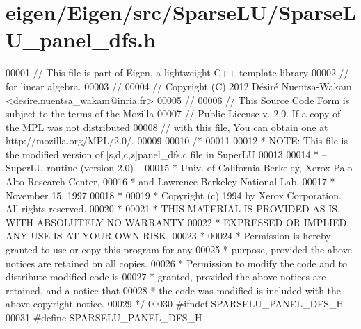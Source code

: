 \hypertarget{eigen_2_eigen_2src_2_sparse_l_u_2_sparse_l_u__panel__dfs_8h_source}{}\section{eigen/\+Eigen/src/\+Sparse\+L\+U/\+Sparse\+L\+U\+\_\+panel\+\_\+dfs.h}
\label{eigen_2_eigen_2src_2_sparse_l_u_2_sparse_l_u__panel__dfs_8h_source}

\begin{DoxyCode}
00001 \textcolor{comment}{// This file is part of Eigen, a lightweight C++ template library}
00002 \textcolor{comment}{// for linear algebra.}
00003 \textcolor{comment}{//}
00004 \textcolor{comment}{// Copyright (C) 2012 Désiré Nuentsa-Wakam <desire.nuentsa\_wakam@inria.fr>}
00005 \textcolor{comment}{//}
00006 \textcolor{comment}{// This Source Code Form is subject to the terms of the Mozilla}
00007 \textcolor{comment}{// Public License v. 2.0. If a copy of the MPL was not distributed}
00008 \textcolor{comment}{// with this file, You can obtain one at http://mozilla.org/MPL/2.0/.}
00009 
00010 \textcolor{comment}{/* }
00011 \textcolor{comment}{ }
00012 \textcolor{comment}{ * NOTE: This file is the modified version of [s,d,c,z]panel\_dfs.c file in SuperLU }
00013 \textcolor{comment}{ }
00014 \textcolor{comment}{ * -- SuperLU routine (version 2.0) --}
00015 \textcolor{comment}{ * Univ. of California Berkeley, Xerox Palo Alto Research Center,}
00016 \textcolor{comment}{ * and Lawrence Berkeley National Lab.}
00017 \textcolor{comment}{ * November 15, 1997}
00018 \textcolor{comment}{ *}
00019 \textcolor{comment}{ * Copyright (c) 1994 by Xerox Corporation.  All rights reserved.}
00020 \textcolor{comment}{ *}
00021 \textcolor{comment}{ * THIS MATERIAL IS PROVIDED AS IS, WITH ABSOLUTELY NO WARRANTY}
00022 \textcolor{comment}{ * EXPRESSED OR IMPLIED.  ANY USE IS AT YOUR OWN RISK.}
00023 \textcolor{comment}{ *}
00024 \textcolor{comment}{ * Permission is hereby granted to use or copy this program for any}
00025 \textcolor{comment}{ * purpose, provided the above notices are retained on all copies.}
00026 \textcolor{comment}{ * Permission to modify the code and to distribute modified code is}
00027 \textcolor{comment}{ * granted, provided the above notices are retained, and a notice that}
00028 \textcolor{comment}{ * the code was modified is included with the above copyright notice.}
00029 \textcolor{comment}{ */}
00030 \textcolor{preprocessor}{#ifndef SPARSELU\_PANEL\_DFS\_H}
00031 \textcolor{preprocessor}{#define SPARSELU\_PANEL\_DFS\_H}

\end{DoxyCode}
